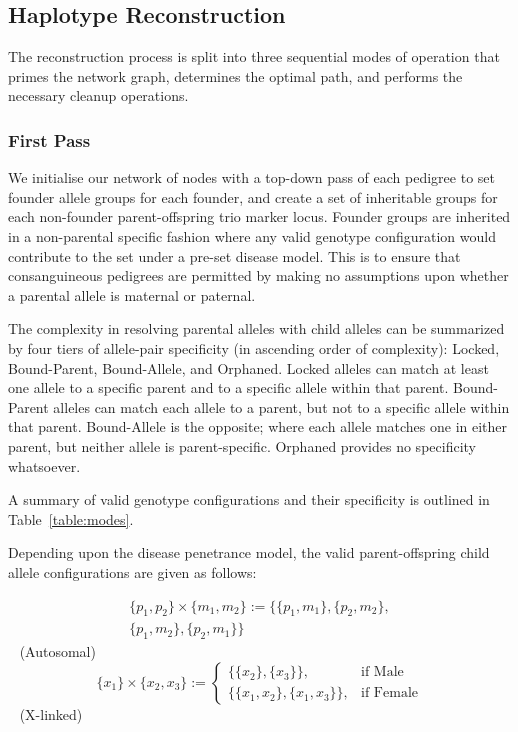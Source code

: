 
\subsection{Haplotype Reconstruction}

The reconstruction process is split into three sequential modes of operation that primes the network graph, determines the optimal path, and performs the necessary cleanup operations.

\subsubsection{First Pass}



We initialise our network of nodes with a top-down pass of each pedigree to set founder allele groups for each founder, and create a set of inheritable groups for each non-founder parent-offspring trio marker locus. Founder groups are inherited in a non-parental specific fashion where any valid genotype configuration would contribute to the set under a pre-set disease model. This is to ensure that consanguineous pedigrees are permitted by making no assumptions upon whether a parental allele is maternal or paternal.

The complexity in resolving parental alleles with child alleles can be summarized by four tiers of allele-pair specificity (in ascending order of complexity): Locked, Bound-Parent, Bound-Allele, and Orphaned. Locked alleles can match at least one allele to a specific parent and to a specific allele within that parent. Bound-Parent alleles can match each allele to a parent, but not to a specific allele within that parent. Bound-Allele is the opposite; where each allele matches one in either parent, but neither allele is parent-specific. Orphaned provides no specificity whatsoever. 

A summary of valid genotype configurations and their specificity is outlined in Table~\ref{table:modes}.

Depending upon the disease penetrance model, the valid parent-offspring child allele configurations are given as follows:

\begin{equation}
\begin{split}
\{p_1,p_2\} \times \{m_1,m_2\} := \{\{p_1,m_1\},\{p_2,m_2\},\\\{p_1,m_2\},\{p_2,m_1\}\}
\end{split}
\end{equation}\
(Autosomal)\
\
\begin{equation}
\{x_1\} \times \{x_2,x_3\} :=
\begin{cases}
  \{\{x_2\},\{x_3\}\},& \text{if Male}\\
  \{\{x_1,x_2\},\{x_1,x_3\}\},& \text{if Female}
\end{cases}
\end{equation}\
(X-linked)
\vspace{5pt}

